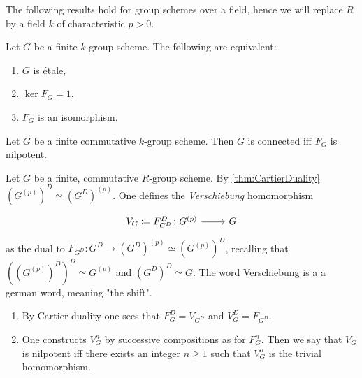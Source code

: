 \noindent
The following results hold for group schemes over a field, hence we will replace
$R$ by a field $k$ of characteristic $p > 0$.
\begin{prop}[]\label{thm:FrobeniusChar1}
	Let $G$ be a finite $k$-group scheme.
	The following are equivalent:
\begin{enumerate}
	\item $G$ is étale,
	\item $\ker F_G = 1$,
	\item $F_G$ is an isomorphism.
\end{enumerate}
\end{prop}


\begin{prop}[]\label{thm:FrobeniusChar2}
	Let $G$ be a finite commutative $k$-group scheme.
	Then $G$ is connected iff $F_G$ is nilpotent.
\end{prop}


\begin{defn}[Verschiebung]
	Let $G$ be a finite, commutative $R$-group scheme.
	By \cref{thm:CartierDuality} $(G^{(p)})^D \simeq (G^D)^{(p)}$.
	One defines the \emph{Verschiebung} homomorphism
	\begin{equation*}
	\begin{tikzcd}[row sep = 0ex
		,/tikz/column 1/.append style={anchor=base east}
		,/tikz/column 2/.append style={anchor=base west}]
		V_G \coloneqq F^D_{G^D}\colon G^{(p)} \arrow[r, "", rightarrow] &
		G
	\end{tikzcd}
	\end{equation*} 
	as the dual to $F_{G^D}\colon G^D \to (G^D)^{(p)} \simeq (G^{(p)})^D$,
	recalling that $((G^{(p)})^D)^D \simeq G^{(p)}$ and $(G^D)^D \simeq G$.
	The word Verschiebung is a a german word, meaning "the shift".
\end{defn}


\begin{rem}[]\leavevmode\vspace{-.2\baselineskip}
\begin{enumerate}
\item By Cartier duality one sees that $F^D_G = V_{G^D}$ and
	$V^D_G = F_{G^D}$.
\item One constructs $V^n_G$ by successive compositions as for $F^n_G$.
	Then we say that $V_G$ is nilpotent iff there exists an integer $n \geq 1$
	such that $V^n_G$ is the trivial homomorphism.
\end{enumerate}
\end{rem}


